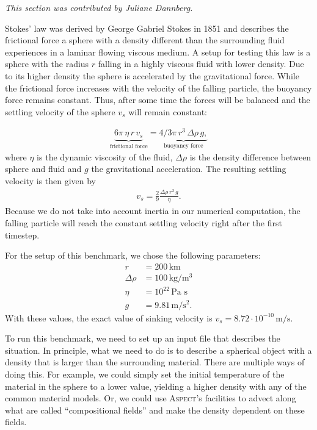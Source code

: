 \documentclass{article}
\newcommand{\aspect}{\textsc{Aspect}}
\begin{document}
\textit{This section was contributed by Juliane Dannberg.}

Stokes' law was derived by George Gabriel Stokes in 1851 and describes the frictional force
a sphere with a density different than the surrounding fluid experiences in a
laminar flowing viscous medium.
A setup for testing this law is a sphere with the radius $r$ falling in a highly
viscous fluid with lower density. Due to its higher density the sphere is
accelerated by the gravitational force. While
the frictional force increases with the velocity of the falling particle,
the buoyancy force remains constant. Thus, after some time the forces will
be balanced and the settling velocity of the sphere $v_s$ will remain constant:

\begin{align}
  \label{eq:stokes-law}
  \underbrace{6 \pi \, \eta \, r \, v_s}_{\text{frictional force}} =
  \underbrace{4/3 \pi \, r^3 \, \Delta\rho \, g,}_{\text{buoyancy force}}
\end{align}
where $\eta$ is the dynamic viscosity of the fluid, $\Delta\rho$ is the
density difference between sphere and fluid and $g$ the gravitational
acceleration. The resulting settling velocity is then given by
\begin{align}
  \label{eq:stokes-velo}
  v_s = \frac{2}{9} \frac{\Delta\rho \, r^2 \, g}{\eta}.
\end{align}
Because we do not take into account inertia in our numerical computation,
the falling particle will reach the constant settling velocity right after
the first timestep.

For the setup of this benchmark, we chose the following parameters:
\begin{align*}
  \label{eq:stokes-parameters}
  r &= 200 \, \text{km}\\
  \Delta\rho &= 100 \, \text{kg}/\text{m}^3\\
  \eta &= 10^{22} \, \text{Pa s}\\
  g &= 9.81 \, \text{m}/\text{s}^2.
\end{align*}
With these values, the exact value of sinking velocity is $v_s =
8.72 \cdot 10^{-10} \, \text{m}/\text{s}$.

To run this benchmark, we need to set up an input file that describes the
situation. In principle, what we need to do is to describe a spherical object
with a density that is larger than the surrounding material. There are multiple
ways of doing this. For example, we could simply set the initial temperature of
the material in the sphere to a lower value, yielding a higher density with any
of the common material models. Or, we could use \aspect{}'s facilities to advect
along what are called ``compositional fields'' and make the density dependent on
these fields.
\end{document}
